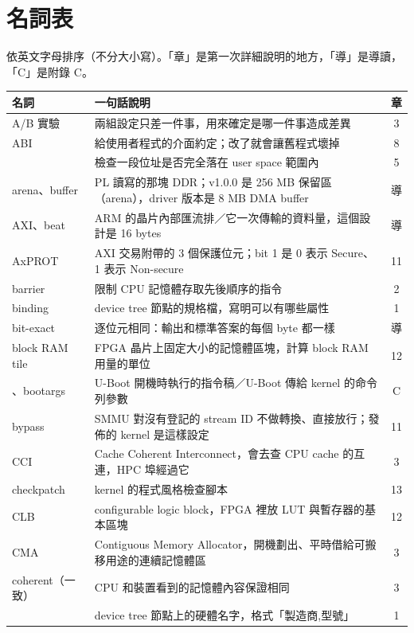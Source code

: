 \clearpage
\section{名詞表}

依英文字母排序（不分大小寫）。「章」是第一次詳細說明的地方，「導」是導讀，「C」是附錄 C。

\footnotesize
\begin{xltabular}{\textwidth}{l X c}
\toprule
名詞 & 一句話說明 & 章 \\
\midrule
\endhead
A/B 實驗 & 兩組設定只差一件事，用來確定是哪一件事造成差異 & 3 \\
ABI & 給使用者程式的介面約定；改了就會讓舊程式壞掉 & 8 \\
 & 檢查一段位址是否完全落在 user space 範圍內 & 5 \\
arena、buffer & PL 讀寫的那塊 DDR；v1.0.0 是 256 MB 保留區（arena），driver 版本是 8 MB DMA buffer & 導 \\
AXI、beat & ARM 的晶片內部匯流排／它一次傳輸的資料量，這個設計是 16 bytes & 導 \\
AxPROT & AXI 交易附帶的 3 個保護位元；bit 1 是 0 表示 Secure、1 表示 Non-secure & 11 \\
barrier & 限制 CPU 記憶體存取先後順序的指令 & 2 \\
binding & device tree 節點的規格檔，寫明可以有哪些屬性 & 1 \\
bit-exact & 逐位元相同：輸出和標準答案的每個 byte 都一樣 & 導 \\
block RAM tile & FPGA 晶片上固定大小的記憶體區塊，計算 block RAM 用量的單位 & 12 \\
、bootargs & U-Boot 開機時執行的指令稿／U-Boot 傳給 kernel 的命令列參數 & C \\
bypass & SMMU 對沒有登記的 stream ID 不做轉換、直接放行；發佈的 kernel 是這樣設定 & 11 \\
CCI & Cache Coherent Interconnect，會去查 CPU cache 的互連，HPC 埠經過它 & 3 \\
checkpatch & kernel 的程式風格檢查腳本  & 13 \\
CLB & configurable logic block，FPGA 裡放 LUT 與暫存器的基本區塊 & 12 \\
CMA & Contiguous Memory Allocator，開機劃出、平時借給可搬移用途的連續記憶體區 & 3 \\
coherent（一致） & CPU 和裝置看到的記憶體內容保證相同 & 3 \\
 & device tree 節點上的硬體名字，格式「製造商,型號」 & 1 \\

\end{xltabular}
